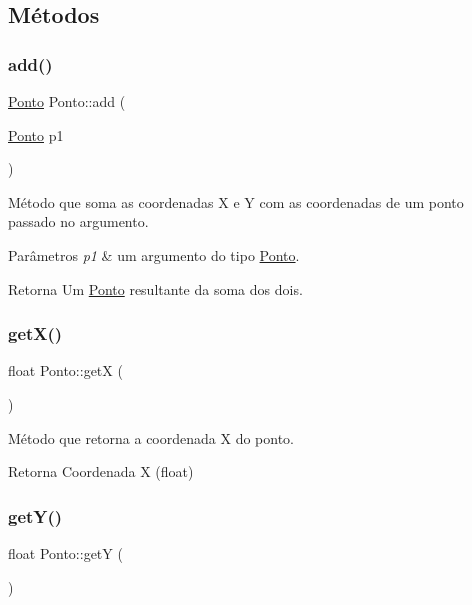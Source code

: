 \subsection{Métodos}
\mbox{\label{classPonto_abb68d6122278de262e8ed1c70714e3d9}} 
\subsubsection{\texorpdfstring{add()}{add()}}
{\footnotesize\ttfamily \hyperlink{classPonto}{Ponto} Ponto\+::add (\begin{DoxyParamCaption}\item[{\hyperlink{classPonto}{Ponto}}]{p1 }\end{DoxyParamCaption})}



Método que soma as coordenadas X e Y com as coordenadas de um ponto passado no argumento. 


\begin{DoxyParams}{Parâmetros}
{\em p1} & um argumento do tipo \hyperlink{classPonto}{Ponto}. \\
\hline
\end{DoxyParams}
\begin{DoxyReturn}{Retorna}
Um \hyperlink{classPonto}{Ponto} resultante da soma dos dois. 
\end{DoxyReturn}
\mbox{\label{classPonto_ae4823d6ee26ff3448ee403d26a3c6d2f}} 
\subsubsection{\texorpdfstring{get\+X()}{getX()}}
{\footnotesize\ttfamily float Ponto\+::getX (\begin{DoxyParamCaption}{ }\end{DoxyParamCaption})}



Método que retorna a coordenada X do ponto. 

\begin{DoxyReturn}{Retorna}
Coordenada X (float) 
\end{DoxyReturn}
\mbox{\label{classPonto_ab120600953e6544301223b9b05a43ee5}} 
\subsubsection{\texorpdfstring{get\+Y()}{getY()}}
{\footnotesize\ttfamily float Ponto\+::getY (\begin{DoxyParamCaption}{ }\end{DoxyParamCaption})}



